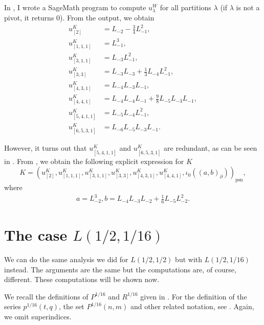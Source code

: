 \documentclass[a4paper, 12pt, reqno]{amsart}
\theoremstyle{remark}
\numberwithin{equation}{subsection}
\DeclareMathOperator{\psn}{psn}
\begin{document}
In \cite[ising-modules.ipynb]{sagemath2}, I wrote a SageMath program to compute $u^W_{\lambda}$ for all partitions $\lambda$ (if $\lambda$ is not a pivot, it returns $0$).
From the output, we obtain
\begin{align*}
  u^K_{[2]} &= L_{-2} - \tfrac{3}{4}L_{-1}^2, \\
  u^K_{[1, 1, 1]} &= L_{-1}^3, \\
  u^K_{[3, 1, 1]} &= L_{-3}L_{-1}^2, \\
  u^K_{[3, 3]} &= L_{-3}L_{-3} + \tfrac{1}{3}L_{-4}L_{-1}^2, \\
  u^K_{[4, 3, 1]} &= L_{-4}L_{-3}L_{-1}, \\
  u^K_{[4, 4, 1]} &= L_{-4}L_{-4}L_{-1} + \tfrac{9}{8}L_{-5}L_{-3}L_{-1}, \\
  u^K_{[5, 4, 1, 1]} &= L_{-5}L_{-4}L_{-1}^2, \\
  u^K_{[6, 5, 3, 1]} &= L_{-6}L_{-5}L_{-3}L_{-1}.
\end{align*}

However, it turns out that $u^K_{[5, 4, 1, 1]}$ and $u^K_{[6, 5, 3, 1]}$ are redundant, as can be seen in \cite[m11-m15.ipynb]{sagemath2}.
From \cite[Theorem 2]{andrews_singular_2022}, we obtain the following explicit expression for $K$
\begin{equation*}
  K = (u^K_{[2]}, u^K_{[1, 1, 1]}, u^K_{[3, 1, 1]}, u^K_{[3, 3]}, u^K_{[4, 3, 1]}, u^K_{[4, 4, 1]}, \iota_0((a, b)_{\partial}))_{\psn},
\end{equation*}
where
\begin{align*}
  a = L_{-2}^3, b = L_{-4}L_{-3}L_{-2} + \tfrac{1}{6}L_{-5}L_{-2}^2.
\end{align*}


\section{The case $L(1/2, 1/16)$}
\label{sec:case-l12-116}

We can do the same analysis we did for $L(1/2, 1/2)$ but with $L(1/2, 1/16)$ instead.
The arguments are the same but the computations are, of course, different.
These computations will be shown now.

We recall the definitions of $P^{1/16}$ and $R^{1/16}$ given in .
For the definition of the series $p^{1/16}(t, q)$, the set $P^{1/16}(n, m)$ and other related notation, see .
Again, we omit superindices.
\end{document}
